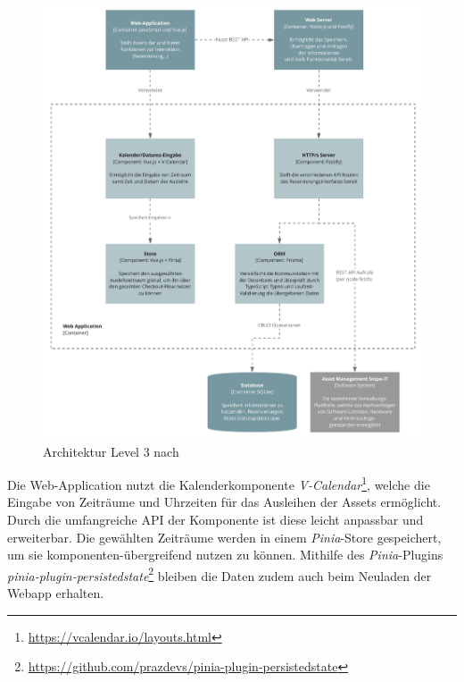 \begin{figure}[h]
    \centering
    \includegraphics[scale=0.9]{Bilder/C4_3.pdf}
    \caption[Architektur Level 3]{Architektur Level 3 nach }
    \label{fig:level3}
\end{figure}

Die Web-Application nutzt die Kalenderkomponente
\textit{V-Calendar}\footnote{\url{https://vcalendar.io/layouts.html}}, welche die Eingabe von
Zeiträume und Uhrzeiten für das Ausleihen der Assets ermöglicht. Durch die umfangreiche API der
Komponente ist diese leicht anpassbar und erweiterbar. Die gewählten Zeiträume werden in einem
\textit{Pinia}-Store gespeichert, um sie komponenten-übergreifend nutzen zu können. Mithilfe des
\textit{Pinia}-Plugins
\textit{pinia-plugin-persistedstate}\footnote{\url{https://github.com/prazdevs/pinia-plugin-persistedstate}}
bleiben die Daten zudem auch beim Neuladen der Webapp erhalten.



